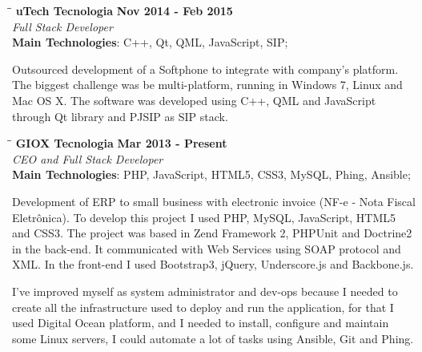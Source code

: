 \documentclass[margin]{res}
\begin{document}
\begin{resume}
\vspace{-0.1in}
    \begin{tabbing}
    \hspace{2.3in}\= \hspace{1.7in}\= \kill
    \textbf{uTech Tecnologia}    \>\>\textbf{Nov 2014 - Feb 2015}\\
    \textit{Full Stack Developer}\\
    \textbf{Main Technologies}: C++, Qt, QML, JavaScript, SIP;
    \end{tabbing}\vspace{-20pt}
    \vspace{2mm}
Outsourced development of a Softphone to integrate with company’s platform. The biggest challenge was be multi-platform, running in Windows 7, Linux and Mac OS X. The software was developed using C++, QML and JavaScript through Qt library and PJSIP as SIP stack.    

\vspace{-0.1in}
    \begin{tabbing}
    \hspace{2.3in}\= \hspace{1.7in}\= \kill
    \textbf{GIOX Tecnologia}    \>\>\textbf{Mar 2013 - Present}\\
    \textit{CEO and Full Stack Developer}\\
    \textbf{Main Technologies}: PHP, JavaScript, HTML5, CSS3, MySQL, Phing, Ansible;
    \end{tabbing}\vspace{-20pt}
    \vspace{2mm}
Development of ERP to small business with electronic invoice (NF-e - Nota Fiscal Eletrônica). To develop this project I used PHP, MySQL, JavaScript, HTML5 and CSS3. The project was based in Zend Framework 2, PHPUnit and Doctrine2 in the back-end. It communicated with Web Services using SOAP protocol and XML. In the front-end I used Bootstrap3, jQuery, Underscore.js and Backbone.js.

I've improved myself as system administrator and dev-ops because I needed to create all the infrastructure used to deploy and run the application, for that I used Digital Ocean platform, and I needed to install, configure and maintain some Linux servers, I could automate a lot of tasks using Ansible, Git and Phing.


\end{resume}
\end{document}
